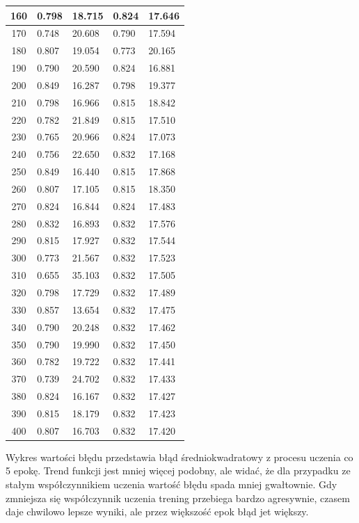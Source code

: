 \documentclass{report}
\begin{document}
\begin{longtable}{|c|l|l|l|l|}
        160 & 0.798 & 18.715 & 0.824 & 17.646 \\ \hline
        170 & 0.748 & 20.608 & 0.790 & 17.594 \\ \hline
        180 & 0.807 & 19.054 & 0.773 & 20.165 \\ \hline
        190 & 0.790 & 20.590 & 0.824 & 16.881 \\ \hline
        200 & 0.849 & 16.287 & 0.798 & 19.377 \\ \hline
        210 & 0.798 & 16.966 & 0.815 & 18.842 \\ \hline
        220 & 0.782 & 21.849 & 0.815 & 17.510 \\ \hline
        230 & 0.765 & 20.966 & 0.824 & 17.073 \\ \hline
        240 & 0.756 & 22.650 & 0.832 & 17.168 \\ \hline
        250 & 0.849 & 16.440 & 0.815 & 17.868 \\ \hline
        260 & 0.807 & 17.105 & 0.815 & 18.350 \\ \hline
        270 & 0.824 & 16.844 & 0.824 & 17.483 \\ \hline
        280 & 0.832 & 16.893 & 0.832 & 17.576 \\ \hline
        290 & 0.815 & 17.927 & 0.832 & 17.544 \\ \hline
        300 & 0.773 & 21.567 & 0.832 & 17.523 \\ \hline
        310 & 0.655 & 35.103 & 0.832 & 17.505 \\ \hline
        320 & 0.798 & 17.729 & 0.832 & 17.489 \\ \hline
        330 & 0.857 & 13.654 & 0.832 & 17.475 \\ \hline
        340 & 0.790 & 20.248 & 0.832 & 17.462 \\ \hline
        350 & 0.790 & 19.990 & 0.832 & 17.450 \\ \hline
        360 & 0.782 & 19.722 & 0.832 & 17.441 \\ \hline
        370 & 0.739 & 24.702 & 0.832 & 17.433 \\ \hline
        380 & 0.824 & 16.167 & 0.832 & 17.427 \\ \hline
        390 & 0.815 & 18.179 & 0.832 & 17.423 \\ \hline
        400 & 0.807 & 16.703 & 0.832 & 17.420 \\
    \end{longtable}

    Wykres wartości błędu przedstawia błąd średniokwadratowy z procesu uczenia co 5 epokę.
    Trend funkcji jest mniej więcej podobny, ale widać, że dla przypadku ze stałym współczynnikiem uczenia wartość błędu spada mniej gwałtownie.
    Gdy zmniejsza się współczynnik uczenia trening przebiega bardzo agresywnie, czasem daje chwilowo lepsze wyniki, ale przez większość epok błąd jet większy.
\end{document}
